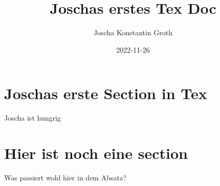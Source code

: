 \documentclass[a4paper]{article}
\title{Joschas erstes Tex Doc}
\author{Joscha Konstantin Groth}
\date{2022-11-26}
\begin{document}
\begin{titlepage}
    \maketitle
\end{titlepage}
\pagebreak
\tableofcontents
\pagebreak
\section{Joschas erste Section in Tex}
Joscha ist hungrig

\section{Hier ist noch eine section}
Was passiert wohl hier in dem Absatz?
\end{document}
